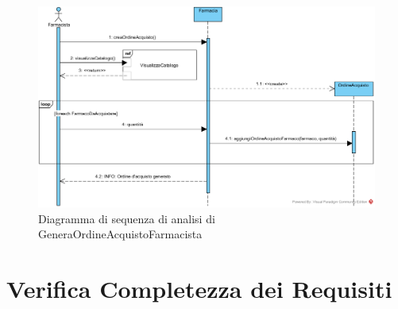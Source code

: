 \begin{figure}[!ht]
	\centering
	\includegraphics[width=\linewidth]{assets/sequence_analisi/SequenceAnalisiGeneraOrdineAcquistoFarmacista.png}
	\caption{Diagramma di sequenza di analisi di GeneraOrdineAcquistoFarmacista}
\end{figure}

\section{Verifica Completezza dei Requisiti}

